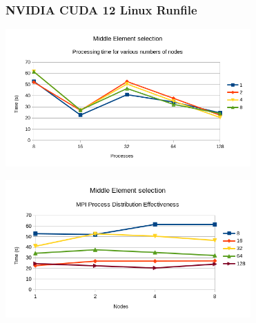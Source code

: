 \documentclass[11pt]{article}
\begin{document}
\subsubsection{NVIDIA CUDA 12 Linux Runfile}
\label{sec:org2b236fe}
\begin{center}
\includegraphics[height=200]{./charts/cuda-12-runfile/processing-time-nodes.png}
\end{center}
\begin{center}
\includegraphics[height=200]{./charts/cuda-12-runfile/process-distribution-effectiveness.png}
\end{center}

\printbibliography
\end{document}

